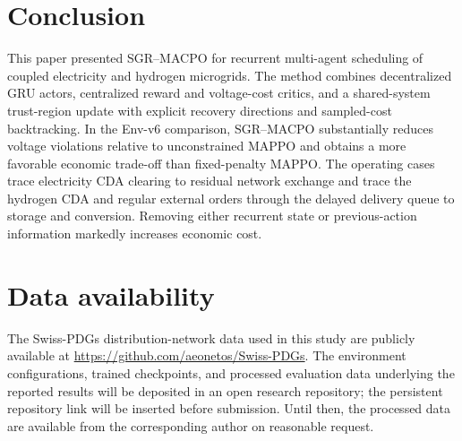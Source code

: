 \documentclass[final,5p,times]{elsarticle}
\newcommand{\method}{SGR--MACPO\xspace}
\begin{document}
\section{Conclusion}
\label{sec:conclusion}

This paper presented \method for recurrent multi-agent scheduling of coupled electricity and hydrogen microgrids. The method combines decentralized GRU actors, centralized reward and voltage-cost critics, and a shared-system trust-region update with explicit recovery directions and sampled-cost backtracking. In the Env-v6 comparison, \method substantially reduces voltage violations relative to unconstrained MAPPO and obtains a more favorable economic trade-off than fixed-penalty MAPPO. The operating cases trace electricity CDA clearing to residual network exchange and trace the hydrogen CDA and regular external orders through the delayed delivery queue to storage and conversion. Removing either recurrent state or previous-action information markedly increases economic cost.

\section*{Data availability}

The Swiss-PDGs distribution-network data used in this study are publicly available at \url{https://github.com/aeonetos/Swiss-PDGs}. The environment configurations, trained checkpoints, and processed evaluation data underlying the reported results will be deposited in an open research repository; the persistent repository link will be inserted before submission. Until then, the processed data are available from the corresponding author on reasonable request.
\end{document}
